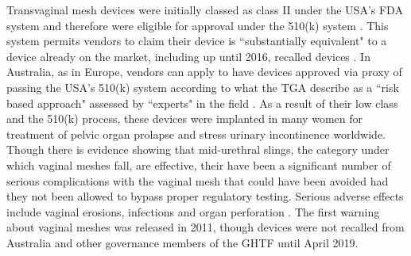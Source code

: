 \documentclass[12pt, openany, oneside]{book}
\begin{document}
Transvaginal mesh devices were initially classed as class II under the USA's FDA  system and therefore were eligible for approval under the 510(k) system \citep{heneghan2017trials}. This system permits vendors to claim their device is ``substantially equivalent" to a device already on the market, including up until 2016, recalled devices \citep{ho2014fixing}. In Australia, as in Europe, vendors can apply to have devices approved via proxy of passing the USA's 510(k) system according to what the TGA describe as a ``risk based approach" assessed by ``experts" in the field \citep{tga}. As a result of their low class and the 510(k) process, these devices were implanted in many women for treatment of pelvic organ prolapse and stress urinary incontinence worldwide. Though there is evidence showing that mid-urethral slings, the category under which vaginal meshes fall, are effective, their have been a significant number of serious complications with the vaginal mesh that could have been avoided had they not been allowed to bypass proper regulatory testing. Serious adverse effects include vaginal erosions, infections and organ perforation \citep{heneghan2017trials}. The first warning about vaginal meshes was released in 2011, though devices were not recalled from Australia and other governance members of the GHTF until April 2019.\\
\end{document}

